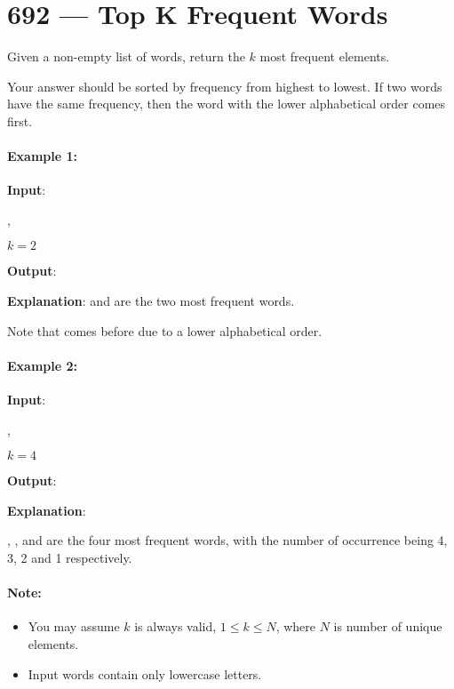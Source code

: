\section{692 --- Top K Frequent Words}
Given a non-empty list of words, return the $k$ most frequent elements.

Your answer should be sorted by frequency from highest to lowest. If two words have the same frequency, then the word with the lower alphabetical order comes first.

\paragraph{Example 1:}

\begin{flushleft}
\textbf{Input}: 

, 

$k = 2$

\textbf{Output}: \fcc{["i", "love"]}

\textbf{Explanation}:  and  are the two most frequent words.

Note that  comes before  due to a lower alphabetical order.
\end{flushleft}

\paragraph{Example 2:}

\begin{flushleft}
\textbf{Input}: 

, 

$k = 4$

\textbf{Output}: 

\textbf{Explanation}: 

, ,  and  are the four most frequent words, with the number of occurrence being 4, 3, 2 and 1 respectively.
\end{flushleft}

\paragraph{Note:}

\begin{itemize}
\item You may assume $ k $ is always valid, $1 \leq k \leq N$, where $N$ is number of unique elements.
\item Input words contain only lowercase letters.
\end{itemize}

